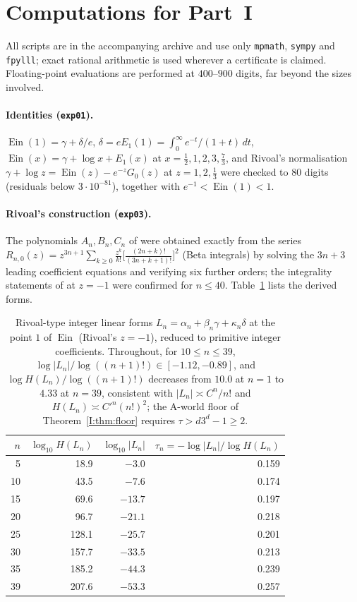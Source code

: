 \documentclass[11pt,a4paper]{article}
\newcommand{\Ein}{\operatorname{Ein}}
\theoremstyle{definition}
\theoremstyle{remark}
\numberwithin{equation}{section}
\begin{document}
\section{Computations for Part~I}\label{I:sec:computations}

All scripts are in the accompanying archive and use only \texttt{mpmath}, \texttt{sympy}
and \texttt{fpylll}; exact rational arithmetic is used wherever a certificate is claimed.
Floating-point evaluations are performed at $400$--$900$ digits, far beyond the sizes
involved.

\paragraph{Identities (\texttt{exp01}).} $\Ein(1)=\gamma+\delta/e$,
$\delta=eE_1(1)=\int_0^\infty e^{-t}/(1+t)\,dt$, $\Ein(x)=\gamma+\log x+E_1(x)$ at
$x=\tfrac12,1,2,3,\tfrac73$, and Rivoal's normalisation
$\gamma+\log z=\Ein(z)-e^{-z}G_0(z)$ at $z=1,2,\tfrac13$ were checked to $80$ digits
(residuals below $3\cdot10^{-81}$), together with $e^{-1}<\Ein(1)<1$.

\paragraph{Rivoal's construction (\texttt{exp03}).} The polynomials $A_n,B_n,C_n$ of
\cite[Prop.~4]{Rivoal2012} were obtained exactly from the series
$R_{n,0}(z)=z^{3n+1}\sum_{k\ge0}\frac{z^k}{k!}\bigl[\frac{(2n+k)!}{(3n+k+1)!}\bigr]^2$
(Beta integrals) by solving the $3n+3$ leading coefficient equations and verifying six
further orders; the integrality statements of \cite[Lemma~4(i)]{Rivoal2012} at $z=-1$
were confirmed for $n\le40$. Table~\ref{I:tab:rivoal} lists the derived forms.

\begin{table}[h]\centering\small
\begin{tabular}{@{}rrrr@{}}
\toprule
$n$ & $\log_{10}H(L_n)$ & $\log_{10}|L_n|$ & $\tau_n=-\log|L_n|/\log H(L_n)$\\
\midrule
5 & 18.9 & $-3.0$ & 0.159\\
10 & 43.5 & $-7.6$ & 0.174\\
15 & 69.6 & $-13.7$ & 0.197\\
20 & 96.7 & $-21.1$ & 0.218\\
25 & 128.1 & $-25.7$ & 0.201\\
30 & 157.7 & $-33.5$ & 0.213\\
35 & 185.2 & $-44.3$ & 0.239\\
39 & 207.6 & $-53.3$ & 0.257\\
\bottomrule
\end{tabular}
\caption{Rivoal-type integer linear forms $L_n=\alpha_n+\beta_n\gamma+\kappa_n\delta$
at the point $1$ of $\Ein$ (Rivoal's $z=-1$), reduced to primitive integer coefficients.
Throughout,
for $10\le n\le39$, $\log|L_n|/\log((n+1)!)\in[-1.12,-0.89]$, and
$\log H(L_n)/\log((n+1)!)$ decreases from $10.0$ at $n=1$ to $4.33$ at $n=39$, consistent with $|L_n|\asymp C^n/n!$ and $H(L_n)\asymp C'^{n}(n!)^2$;
the $\mathrm A$-world floor of Theorem~\ref{I:thm:floor} requires $\tau>d3^d-1\ge2$.}
\label{I:tab:rivoal}
\end{table}
\end{document}
